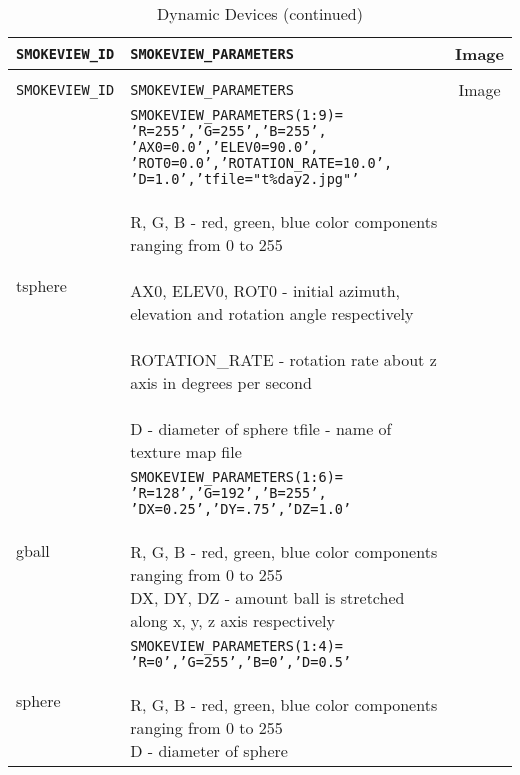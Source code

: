 \begin{longtable}[ht]{|l|l|c|}
\caption{Dynamic Devices}
\label{tab:devices_dynamic}
\\ \hline
{\tt SMOKEVIEW\_ID}  & {\tt SMOKEVIEW\_PARAMETERS} & Image  \\ \hline \hline
\endfirsthead
\caption{Dynamic Devices (continued)}
\\ \hline
{\tt SMOKEVIEW\_ID}  & {\tt SMOKEVIEW\_PARAMETERS} & Image  \\ \hline \hline
\endhead

tsphere&
\parbox[c]{\boxwidth}{
    {\tt SMOKEVIEW\_PARAMETERS(1:9)=}\\
    {\tt 'R=255','G=255','B=255',}\\
    {\tt 'AX0=0.0','ELEV0=90.0',}\\
    {\tt 'ROT0=0.0','ROTATION\_RATE=10.0',}\\
    {\tt 'D=1.0','tfile="t\%day2.jpg"'}\\ \\
R, G, B - red, green, blue color components ranging from 0 to 255\\ \\
AX0, ELEV0, ROT0 - initial azimuth, elevation and rotation angle respectively\\ \\
ROTATION\_RATE - rotation rate about z axis in degrees per second\\ \\
D - diameter of sphere
tfile - name of texture map file

} &
 \\ \hline

gball&
\parbox[c]{\boxwidth}{
{\tt SMOKEVIEW\_PARAMETERS(1:6)=}\\
{\tt 'R=128','G=192','B=255',}\\
{\tt 'DX=0.25','DY=.75','DZ=1.0'}\\  \\
R, G, B - red, green, blue color components ranging from 0 to 255\\
DX, DY, DZ - amount ball is stretched along x, y, z axis respectively
} &
 \\ \hline

sphere&
\parbox[c]{\boxwidth}{
{\tt SMOKEVIEW\_PARAMETERS(1:4)=}\\
{\tt 'R=0','G=255','B=0','D=0.5'}\\ \\
R, G, B - red, green, blue color components ranging from 0 to 255\\
D - diameter of sphere
} &
 \\ \hline


\end{longtable}
